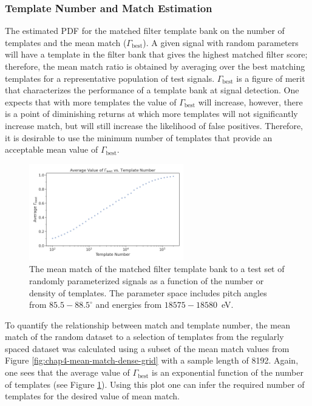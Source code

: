 \subsubsection{Template Number and Match Estimation}
The estimated PDF for the matched filter template bank on the number of templates and the mean match ($\Gamma_\mathrm{best}$). A given signal with random parameters will have a template in the filter bank that gives the highest matched filter score; therefore, the mean match ratio is obtained by averaging over the best matching templates for a representative population of test signals. $\Gamma_\mathrm{best}$ is a figure of merit that characterizes the performance of a template bank at signal detection. One expects that with more templates the value of $\Gamma_\mathrm{best}$ will increase, however, there is a point of diminishing returns at which more templates will not significantly increase match, but will still increase the likelihood of false positives. Therefore, it is desirable to use the minimum number of templates that provide an acceptable mean value of $\Gamma_\mathrm{best}$.
\begin{figure}[htbp]
    \centering
    \includegraphics[width=0.6\textwidth]{figs/Chapter-4/230426_mean_match_vs_templates.png}
    \caption{The mean match of the matched filter template bank to a test set of randomly parameterized signals as a function of the number or density of templates. The parameter space includes pitch angles from $85.5-88.5^\circ$ and energies from $18575-18580$~eV.}
    \label{fig:match_vs_template_number}
\end{figure}

To quantify the relationship between match and template number, the mean match of the random dataset to a selection of templates from the regularly spaced dataset was calculated using a subset of the mean match values from Figure \ref{fig:chap4-mean-match-dense-grid} with a sample length of 8192. Again, one sees that the average value of $\Gamma_\mathrm{best}$ is an exponential function of the number of templates (see Figure \ref{fig:match_vs_template_number}). Using this plot one can infer the required number of templates for the desired value of mean match.

